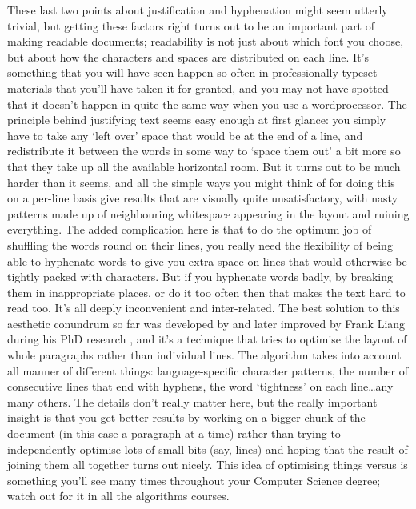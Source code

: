 \begin{refsection}
These last two points about justification and hyphenation might seem utterly trivial, but getting these factors right turns out to be an important part of making readable documents; readability is not just about which font you choose, but about how the characters and spaces are distributed on each line. It's something that you will have seen happen so often in professionally typeset materials that you'll have taken it for granted, and you may not have spotted that it doesn't happen in quite the same way when you use a wordprocessor. The principle behind justifying text seems easy enough at first glance: you simply have to take any `left over' space that would be at the end of a line, and redistribute it between the words in some way to `space them out' a bit more so that they take up all the available horizontal room. But it turns out to be much harder than it seems, and all the simple ways you might think of for doing this on a per-line basis give results that are visually quite unsatisfactory, with nasty patterns made up of neighbouring whitespace appearing in the layout and ruining everything. The added complication here is that to do the optimum job of shuffling the words round on their lines, you really need the flexibility of being able to hyphenate words to give you extra space on lines that would otherwise be tightly packed with characters. But if you hyphenate words badly, by breaking them in inappropriate places, or do it too often then that makes the text hard to read too. It's all deeply inconvenient and inter-related. The best solution to this aesthetic conundrum so far was developed by \cite{SPE:SPE4380111102} and later improved by Frank Liang during his PhD research \citep{liang}, and it's a technique that tries to optimise the layout of whole paragraphs rather than individual lines. The algorithm takes into account all manner of different things: language-specific character patterns, the number of consecutive lines that end with hyphens, the word `tightness' on each line\ldots any many others. The details don't really matter here, but the really important insight is that you get better results by working on a bigger chunk of the document (in this case a paragraph at a time) rather than trying to independently optimise lots of small bits (say, lines) and hoping that the result of joining them all together turns out nicely. This idea of optimising things  versus  is something you'll see many times throughout your Computer Science degree; watch out for it in all the algorithms courses.


\end{refsection}
